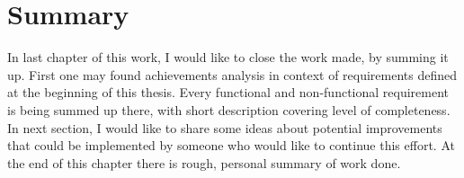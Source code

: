 %


\chapter{Summary}
\label{cha:summary}

\parbox{0.8\textwidth}{

{\small
In last chapter of this work, I would like to close the work made, by summing it up. First one may found achievements analysis in context of requirements defined at the beginning of this thesis.  Every functional and non-functional  requirement is being summed up there, with short description covering level of completeness. In next section, I would like to share some ideas about potential improvements that could be implemented by someone who would like to continue this effort. At the end of this chapter there is rough, personal summary of work done.
}
}














